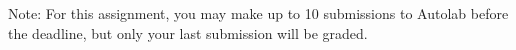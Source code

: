 \documentclass[11pt]{exam}
\numberwithin{equation}{section} %
\numberwithin{figure}{section} %
\numberwithin{table}{section} %
\begin{document}

Note: For this assignment, you may make up to 10 submissions to Autolab before the deadline, but only your last submission will be graded.

\end{document}
